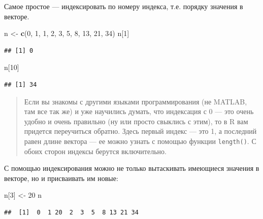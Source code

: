 \documentclass[]{book}
\newenvironment{Shaded}{\begin{snugshade}}{\end{snugshade}}
\newcommand{\KeywordTok}[1]{\textcolor[rgb]{0.13,0.29,0.53}{\textbf{#1}}}
\newcommand{\DecValTok}[1]{\textcolor[rgb]{0.00,0.00,0.81}{#1}}
\newcommand{\StringTok}[1]{\textcolor[rgb]{0.31,0.60,0.02}{#1}}
\newcommand{\NormalTok}[1]{#1}
\begin{document}
Самое простое --- индексировать по номеру индекса, т.е. порядку значения
в векторе.

\begin{Shaded}
\begin{Highlighting}[]
\NormalTok{n <-}\StringTok{ }\KeywordTok{c}\NormalTok{(}\DecValTok{0}\NormalTok{, }\DecValTok{1}\NormalTok{, }\DecValTok{1}\NormalTok{, }\DecValTok{2}\NormalTok{, }\DecValTok{3}\NormalTok{, }\DecValTok{5}\NormalTok{, }\DecValTok{8}\NormalTok{, }\DecValTok{13}\NormalTok{, }\DecValTok{21}\NormalTok{, }\DecValTok{34}\NormalTok{)}
\NormalTok{n[}\DecValTok{1}\NormalTok{]}
\end{Highlighting}
\end{Shaded}

\begin{verbatim}
## [1] 0
\end{verbatim}

\begin{Shaded}
\begin{Highlighting}[]
\NormalTok{n[}\DecValTok{10}\NormalTok{]}
\end{Highlighting}
\end{Shaded}

\begin{verbatim}
## [1] 34
\end{verbatim}

\begin{quote}
Если вы знакомы с другими языками программирования (не MATLAB, там все
так же) и уже научились думать, что индексация с 0 --- это очень удобно
и очень правильно (ну или просто свыклись с этим), то в R вам придется
переучиться обратно. Здесь первый индекс --- это 1, а последний равен
длине вектора --- ее можно узнать с помощью функции \texttt{length()}. С
обоих сторон индексы берутся включительно.
\end{quote}

С помощью индексирования можно не только вытаскивать имеющиеся значения
в векторе, но и присваивать им новые:

\begin{Shaded}
\begin{Highlighting}[]
\NormalTok{n[}\DecValTok{3}\NormalTok{] <-}\StringTok{ }\DecValTok{20}
\NormalTok{n}
\end{Highlighting}
\end{Shaded}

\begin{verbatim}
##  [1]  0  1 20  2  3  5  8 13 21 34
\end{verbatim}
\end{document}
